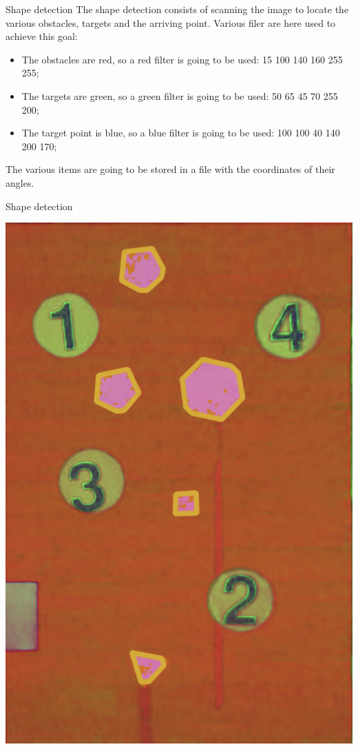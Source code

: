 \begin{frame}[fragile]{Shape detection}
	The shape detection consists of scanning the image to locate the various obstacles, targets and the arriving point. \newline
	Various filer are here used to achieve this goal:
	\begin{itemize}
		\item The obstacles are red, so a red filter is going to be used: 15 100 140 160 255 255;
		\item The targets are green, so a green filter is going to be used: 50 65 45 70 255 200;
		\item The target point is blue, so a blue filter is going to be used: 100 100 40 140 200 170;
	\end{itemize}
	The various items are going to be stored in a file with the coordinates of their angles. 
\end{frame}

\begin{frame}{Shape detection}
	\begin{center}
		\includegraphics[scale=0.25]{Immagini/RedFiltered}
	\end{center}
\end{frame}

